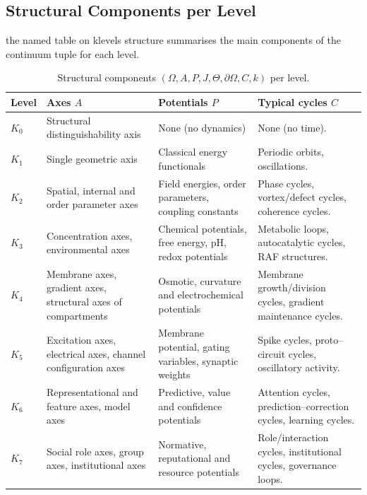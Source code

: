\subsection{Structural Components per Level}

the named table on klevels structure summarises the main components of the
continuum tuple for each level.

\begin{table}[htbp]
  \centering
  \caption{Structural components \((\Omega, A, P, J, \Theta, \partial\Omega, C, k)\) per level.}
  \label{tab:klevels-structure}
  \begin{tabular}{@{}L{0.08\textwidth}L{0.18\textwidth}L{0.22\textwidth}L{0.42\textwidth}@{}}
    \hline
    Level & Axes \(A\) & Potentials \(P\) & Typical cycles \(C\) \\
    \hline
    \(K_0\) &
      Structural distinguishability axis &
      None (no dynamics) &
      None (no time). \\[0.3em]
    \(K_1\) &
      Single geometric axis &
      Classical energy functionals &
      Periodic orbits, oscillations. \\[0.3em]
    \(K_2\) &
      Spatial, internal and order parameter axes &
      Field energies, order parameters, coupling constants &
      Phase cycles, vortex/defect cycles, coherence cycles. \\[0.3em]
    \(K_3\) &
      Concentration axes, environmental axes &
      Chemical potentials, free energy, pH, redox potentials &
      Metabolic loops, autocatalytic cycles, RAF structures. \\[0.3em]
    \(K_4\) &
      Membrane axes, gradient axes, structural axes of compartments &
      Osmotic, curvature and electrochemical potentials &
      Membrane growth/division cycles, gradient maintenance cycles. \\[0.3em]
    \(K_5\) &
      Excitation axes, electrical axes, channel configuration axes &
      Membrane potential, gating variables, synaptic weights &
      Spike cycles, proto--circuit cycles, oscillatory activity. \\[0.3em]
    \(K_6\) &
      Representational and feature axes, model axes &
      Predictive, value and confidence potentials &
      Attention cycles, prediction--correction cycles, learning cycles. \\[0.3em]
    \(K_7\) &
      Social role axes, group axes, institutional axes &
      Normative, reputational and resource potentials &
      Role/interaction cycles, institutional cycles, governance loops. \\[0.3em]

\end{tabular}
\end{table}
